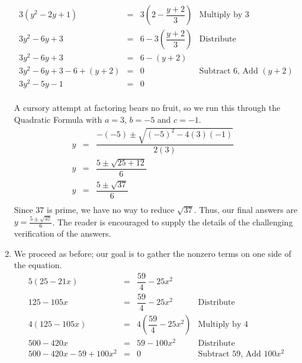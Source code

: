\documentclass{ximera}
\begin{document}
\begin{ex}
\begin{enumerate}
\[\begin{array}{rclr}
3(y^2 - 2y + 1) & = & 3\left(2 - \dfrac{y+2}{3} \right) & \text{Multiply by $3$} \\ [10pt]
3y^2 - 6y + 3 & = & 6 - 3\left(\dfrac{y+2}{3}\right) & \text{Distribute} \\ [8pt]

3y^2 - 6y + 3 & = & 6 - (y+2) & \\

3y^2 - 6y + 3 - 6 + (y+2) & = & 0 & \text{Subtract $6$, Add $(y+2)$}\\

3y^2 - 5y - 1 & = & 0 & \\

\end{array}\]

A cursory attempt at factoring bears no fruit, so we run this through the Quadratic Formula with $a = 3$, $b = -5$ and $c = -1$. \[ \begin{array}{rclr}

y & = & \dfrac{-(-5) \pm \sqrt{(-5)^2 - 4(3)(-1)}}{2(3)} & \\ [8pt]

y & = & \dfrac{5 \pm \sqrt{25 + 12}}{6} & \\[8pt]

y & = & \dfrac{5 \pm \sqrt{37}}{6} & \\

\end{array} \] Since $37$ is prime, we have no way to reduce $\sqrt{37}$.  Thus, our final answers are $y = \frac{5 \pm \sqrt{37}}{6}$. The reader is encouraged to supply the details of the challenging verification of the answers.

\item  We proceed as before; our goal is to gather the nonzero terms on one side of the equation. \[ \begin{array}{rclr}

5(25 - 21x) & = &  \dfrac{59}{4} - 25x^2 & \\ [10pt]

125 - 105x & = & \dfrac{59}{4} - 25x^2 & \text{Distribute} \\ [10pt]

4(125 - 105x) & = & 4\left(\dfrac{59}{4} - 25x^2 \right) & \text{Multiply by $4$} \\ [10pt]

500 - 420x & = & 59 - 100x^2 & \text{Distribute} \\ [10pt]

500 - 420x - 59 + 100x^2 & = & 0 & \text{Subtract $59$, Add $100x^2$} \\ [10pt]


\end{array}\]
\end{enumerate}
\end{ex}
\end{document}
